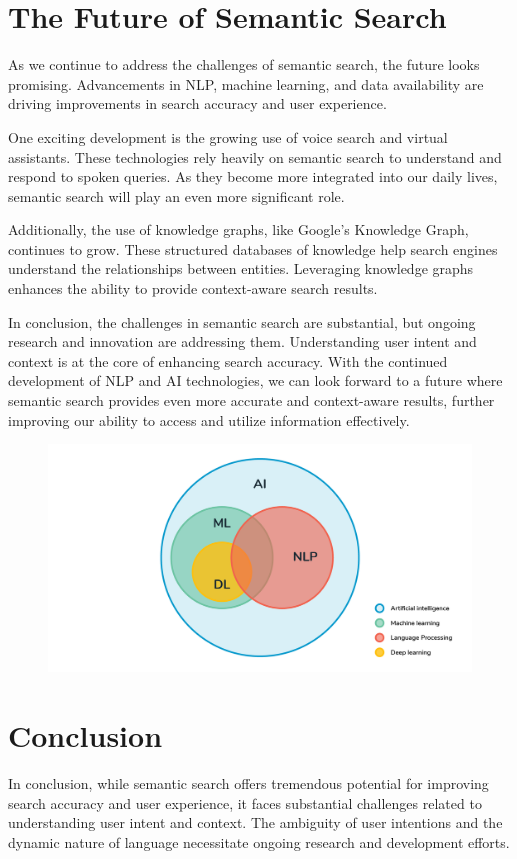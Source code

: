 \documentclass[10pt,oneside,a4paper]{article}
\begin{document}
\section{The Future of Semantic Search}
As we continue to address the challenges of semantic search, the future looks promising. Advancements in NLP, machine learning, and data availability are driving improvements in search accuracy and user experience.

One exciting development is the growing use of voice search and virtual assistants. These technologies rely heavily on semantic search to understand and respond to spoken queries. As they become more integrated into our daily lives, semantic search will play an even more significant role.

Additionally, the use of knowledge graphs, like Google's Knowledge Graph, continues to grow. These structured databases of knowledge help search engines understand the relationships between entities. Leveraging knowledge graphs enhances the ability to provide context-aware search results.

In conclusion, the challenges in semantic search are substantial, but ongoing research and innovation are addressing them. Understanding user intent and context is at the core of enhancing search accuracy. With the continued development of NLP and AI technologies, we can look forward to a future where semantic search provides even more accurate and context-aware results, further improving our ability to access and utilize information effectively.

\begin{figure}[ht]
    \centering
    \includegraphics[width=1\textwidth]{NLP2.png}
\end{figure}

\section{Conclusion}
In conclusion, while semantic search offers tremendous potential for improving search accuracy and user experience, it faces substantial challenges related to understanding user intent and context. The ambiguity of user intentions and the dynamic nature of language necessitate ongoing research and development efforts.
\end{document}
